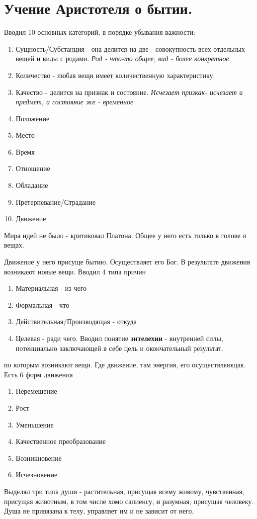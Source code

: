 \documentclass[12pt,a4paper]{article}
\begin{document}
\section{Учение Аристотеля о бытии.}
Вводил 10 основных категорий, в порядке убывания важности:
\begin{enumerate}
\item Сущность/Субстанция - она делится на две - совокупность всех отдельных вещей и виды с родами. \textit{Род - что-то общее, вид - более конкретное}.
\item Количество - любая вещи имеет количественную характеристику.
\item Качество - делится на признак и состояние. \textit{Исчезает призкак- исчезает и предмет, а состояние же - временное}
\item Положение
\item Место
\item Время
\item Отношение
\item Обладание
\item Претерпевание/Страдание
\item Движение
\end{enumerate}
Мира идей не было - критиковал Платона. Общее у него есть только в голове и вещах. 

Движение у него присуще бытию. Осуществляет его Бог.
В результате движения возникают новые вещи. Вводил 4 типа причин
\begin{enumerate}
\item Материальная - из чего
\item Формальная - что
\item Действительная/Производящая - откуда 
\item Целевая - ради чего. Вводил понятие \textbf{энтелехии} - внутренней силы, потенциально заключающей в себе цель и окончательный результат.
\end{enumerate}
по которым возникают вещи. Где движение, там энергия, его осуществляющая. Есть 6 форм движения
\begin{enumerate}
\item Перемещение
\item Рост
\item Уменьшение
\item Качественное преобразование
\item Возникновение
\item Исчезновение
\end{enumerate}
Выделял три типа души - растительная, присущая всему живому, чувственная, присущая животным, в том числе хомо сапиенсу, и разумная, присущая человеку. Душа не привязана к телу, управляет им и не зависит от него.
\end{document}
